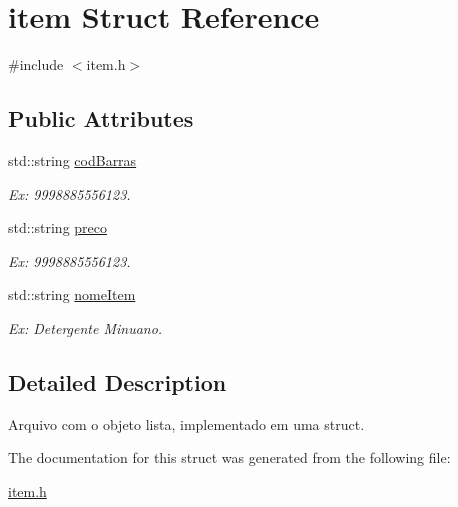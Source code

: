 \hypertarget{structitem}{}\section{item Struct Reference}
\label{structitem}


{\ttfamily \#include $<$item.\+h$>$}

\subsection*{Public Attributes}
\begin{DoxyCompactItemize}
\item 
std\+::string \hyperlink{structitem_a2522cf7fe3fecf06678b76aae7959ab9}{cod\+Barras}\hypertarget{structitem_a2522cf7fe3fecf06678b76aae7959ab9}{}\label{structitem_a2522cf7fe3fecf06678b76aae7959ab9}

\begin{DoxyCompactList}\small\item\em Ex\+: 9998885556123. \end{DoxyCompactList}\item 
std\+::string \hyperlink{structitem_a05de680e508ca9d6c11912abc95578b0}{preco}\hypertarget{structitem_a05de680e508ca9d6c11912abc95578b0}{}\label{structitem_a05de680e508ca9d6c11912abc95578b0}

\begin{DoxyCompactList}\small\item\em Ex\+: 9998885556123. \end{DoxyCompactList}\item 
std\+::string \hyperlink{structitem_a020bd33677c3f7d86de12e7d41986fb9}{nome\+Item}\hypertarget{structitem_a020bd33677c3f7d86de12e7d41986fb9}{}\label{structitem_a020bd33677c3f7d86de12e7d41986fb9}

\begin{DoxyCompactList}\small\item\em Ex\+: Detergente Minuano. \end{DoxyCompactList}\end{DoxyCompactItemize}


\subsection{Detailed Description}
Arquivo com o objeto lista, implementado em uma struct. 

The documentation for this struct was generated from the following file\+:\begin{DoxyCompactItemize}
\item 
\hyperlink{item_8h}{item.\+h}\end{DoxyCompactItemize}
